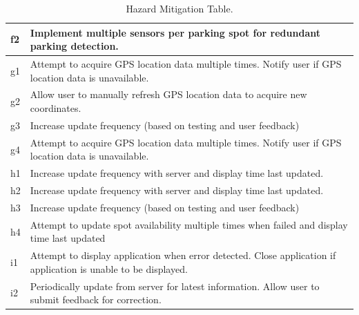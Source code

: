 \documentclass[]{article}
\begin{document}
\begin{table}
\begin{tabular}{ | m{2.5cm} | m{12cm} |}
		\hline 
		f2 & Implement multiple sensors per parking spot for redundant parking detection.  \\	
		\hline 
		g1 & Attempt to acquire GPS location data multiple times. Notify user if GPS location data is unavailable. \\	
		\hline 
		g2 & Allow user to manually refresh GPS location data to acquire new coordinates.  \\	
		\hline 
		g3 & Increase update frequency (based on testing and user feedback)  \\	
		\hline 
		g4 & Attempt to acquire GPS location data multiple times. Notify user if GPS location data is unavailable.  \\	
		\hline 
		h1 & Increase update frequency with server and display time last updated. \\	
		\hline 
		h2 & Increase update frequency with server and display time last updated.  \\	
		\hline 
		h3 & Increase update frequency (based on testing and user feedback)  \\	
		\hline 
		h4 & Attempt to update spot availability multiple times when failed and display time last updated \\	
		\hline 
		i1 & Attempt to display application when error detected. Close application if application is unable to be displayed.   \\	
		\hline 
		i2 & Periodically update from server for latest information. Allow user to submit feedback for correction.  \\	
		
		
		\hline
	\end{tabular}
	\caption{Hazard Mitigation Table.}
\end{table}
\end{document}

